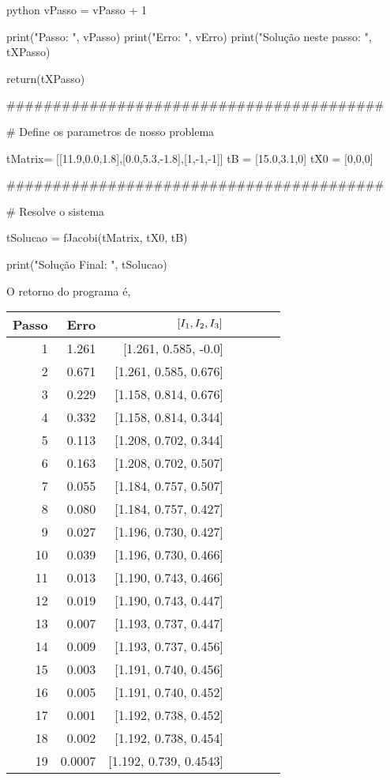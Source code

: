 \documentclass[twoside]{amsart}
\numberwithin{equation}{section}
\begin{document}
\begin{mintedbox}{python}
        vPasso = vPasso + 1
    
        print("Passo: ", vPasso)
        print("Erro: ", vErro)
        print("Solução neste passo: ", tXPasso)

    return(tXPasso)

    #########################################

    # Define os parametros de nosso problema

tMatrix= [[11.9,0.0,1.8],[0.0,5.3,-1.8],[1,-1,-1]]
tB = [15.0,3.1,0]
tX0 = [0,0,0]

    #########################################

    # Resolve o sistema

tSolucao = fJacobi(tMatrix, tX0, tB)

print("Solução Final: ", tSolucao)
\end{mintedbox}

O retorno do programa é,
\centering
{
    \begin{tabular}{rrrrrrr}
        \hline
           Passo  &  Erro &   $\qty[I_1,I_2,I_3]$ \\
        \hline
        1
 &  1.261
 &  [1.261, 0.585, -0.0] \\
   2
 &  0.671
 &  [1.261, 0.585, 0.676] \\
   3
 &  0.229
 &  [1.158, 0.814, 0.676] \\
   4
 &  0.332
 &  [1.158, 0.814, 0.344]\\
   5
 &  0.113
 &  [1.208, 0.702, 0.344]\\
   6
 &  0.163
 &  [1.208, 0.702, 0.507]\\
   7
 &  0.055
 &  [1.184, 0.757, 0.507]\\
   8
 &  0.080
 &  [1.184, 0.757, 0.427]\\
   9
 &  0.027
 &  [1.196, 0.730, 0.427]\\
   10
 &  0.039
 &  [1.196, 0.730, 0.466]\\
   11
 &  0.013
 &  [1.190, 0.743, 0.466]\\
   12
 &  0.019
 &  [1.190, 0.743, 0.447]\\
   13
 &  0.007
 &  [1.193, 0.737, 0.447]\\
   14
 &  0.009
 &  [1.193, 0.737, 0.456]\\
   15
 &  0.003
 &  [1.191, 0.740, 0.456]\\
   16
 &  0.005
 &  [1.191, 0.740, 0.452]\\
   17
 &  0.001
 &  [1.192, 0.738, 0.452]\\
   18
 &  0.002
 &  [1.192, 0.738, 0.454]\\
   19
 &  0.0007
 &  [1.192, 0.739, 0.4543]\\
        \hline
        \end{tabular}
}
\end{document}
